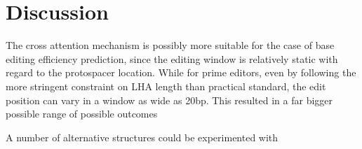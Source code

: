 \chapter{Discussion}

The cross attention mechanism is possibly more suitable for the case of base editing efficiency prediction, since the editing window is relatively static with regard to the protospacer location. While for prime editors, even by following the more stringent constraint on LHA length than practical standard, the edit position can vary in a window as wide as 20bp. This resulted in a far bigger possible range of possible outcomes

A number of alternative structures could be experimented with 